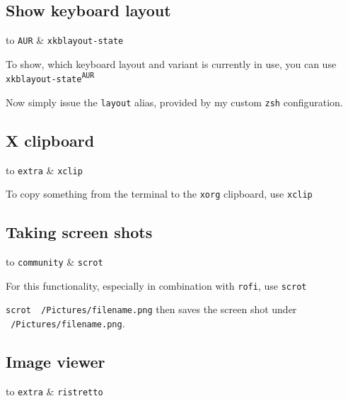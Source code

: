 \documentclass[9pt]{report}
\newenvironment{packagetable}
{\begin{longtabu}to \textwidth [b]{X[1,r]|X[1,l]}}
{\end{longtabu}}
\begin{document}
\newpage

\hypertarget{x-show-keyboard-layout}{\subsection{Show keyboard layout}}
\begin{packagetable}
    \texttt{AUR} & \texttt{xkblayout-state} \\ 
\end{packagetable}

To show, which keyboard layout and variant is currently in use, you can use \texttt{xkblayout-state\textsuperscript{\texttt{AUR}}}


Now simply issue the \texttt{layout} alias, provided by my custom \texttt{zsh} configuration.



\newpage

\hypertarget{x-x-clipboard}{\subsection{X clipboard}}
\begin{packagetable}
    \texttt{extra} & \texttt{xclip} \\ 
\end{packagetable}

To copy something from the terminal to the \texttt{xorg} clipboard, use \texttt{xclip}



\newpage

\hypertarget{x-taking-screen-shots}{\subsection{Taking screen shots}}
\begin{packagetable}
    \texttt{community} & \texttt{scrot} \\ 
\end{packagetable}

For this functionality, especially in combination with \texttt{rofi}, use \texttt{scrot}


\texttt{scrot ~/Pictures/filename.png} then saves the screen shot under \texttt{~/Pictures/filename.png}.



\newpage

\hypertarget{x-image-viewer}{\subsection{Image viewer}}
\begin{packagetable}
    \texttt{extra} & \texttt{ristretto} \\ 
\end{packagetable}
\end{document}

